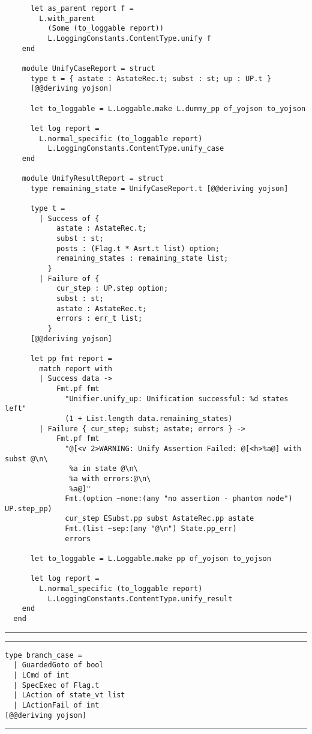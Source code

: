 \begin{verbatim}
      let as_parent report f =
        L.with_parent
          (Some (to_loggable report))
          L.LoggingConstants.ContentType.unify f
    end

    module UnifyCaseReport = struct
      type t = { astate : AstateRec.t; subst : st; up : UP.t }
      [@@deriving yojson]

      let to_loggable = L.Loggable.make L.dummy_pp of_yojson to_yojson

      let log report =
        L.normal_specific (to_loggable report)
          L.LoggingConstants.ContentType.unify_case
    end

    module UnifyResultReport = struct
      type remaining_state = UnifyCaseReport.t [@@deriving yojson]

      type t =
        | Success of {
            astate : AstateRec.t;
            subst : st;
            posts : (Flag.t * Asrt.t list) option;
            remaining_states : remaining_state list;
          }
        | Failure of {
            cur_step : UP.step option;
            subst : st;
            astate : AstateRec.t;
            errors : err_t list;
          }
      [@@deriving yojson]

      let pp fmt report =
        match report with
        | Success data ->
            Fmt.pf fmt
              "Unifier.unify_up: Unification successful: %d states left"
              (1 + List.length data.remaining_states)
        | Failure { cur_step; subst; astate; errors } ->
            Fmt.pf fmt
              "@[<v 2>WARNING: Unify Assertion Failed: @[<h>%a@] with subst @\n\
               %a in state @\n\
               %a with errors:@\n\
               %a@]"
              Fmt.(option ~none:(any "no assertion - phantom node") UP.step_pp)
              cur_step ESubst.pp subst AstateRec.pp astate
              Fmt.(list ~sep:(any "@\n") State.pp_err)
              errors

      let to_loggable = L.Loggable.make pp of_yojson to_yojson

      let log report =
        L.normal_specific (to_loggable report)
          L.LoggingConstants.ContentType.unify_result
    end
  end
\end{verbatim}
\vspace{-0.4cm}
\noindent\rule{\textwidth}{0.5pt}
\vspace{-0.6cm}
\label{lst:unifier-logging}

\vspace{2em}
\noindent\rule{\textwidth}{0.5pt}
\vspace{-0.6cm}
\begin{verbatim}
type branch_case =
  | GuardedGoto of bool
  | LCmd of int
  | SpecExec of Flag.t
  | LAction of state_vt list
  | LActionFail of int
[@@deriving yojson]
\end{verbatim}
\vspace{-0.4cm}
\noindent\rule{\textwidth}{0.5pt}
\vspace{-0.6cm}
\label{lst:branch-case}

